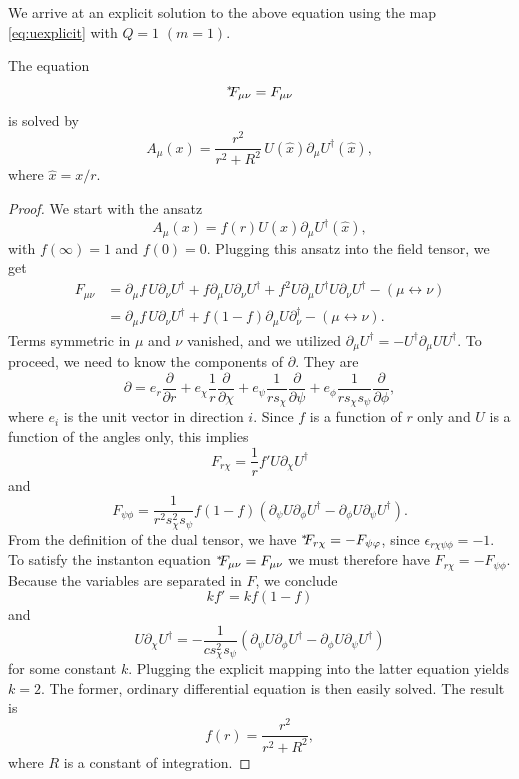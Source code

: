 We arrive at an explicit solution to the above equation using
the map \eqref{eq:uexplicit} with $Q=1$ $(m=1)$.
\begin{proposition}{}{}
The equation
$$
{}^{*\hspace{-1mm}}{F_{\mu\nu}}=F_{\mu\nu}
$$
is solved by
$$
  A_\mu(x)=\frac{r^2}{r^2+R^2}\,U(\hat{x})\partial_\mu U^\dagger(\hat{x}),
$$
where $\hat{x}=x/r.$
  \begin{proof} We start with the ansatz
    $$A_\mu(x)=f(r)U(\hat{x})\partial_\mu U^\dagger(\hat{x}),$$
    with $f(\infty)=1$ and $f(0)=0$. Plugging this ansatz into the
    field tensor, we get
    \begin{equation*}
    \begin{aligned}
      F_{\mu\nu}
        &=\partial_\mu f\,U\partial_\nu U^\dagger
          +f\partial_\mu U\partial_\nu U^\dagger
          +f^2U\partial_\mu U^\dagger U\partial_\nu U^\dagger
          -(\mu\leftrightarrow\nu)\\
        &=\partial_\mu f\,U\partial_\nu U^\dagger
          +f(1-f)\partial_\mu U\partial_\nu^\dagger
          -(\mu\leftrightarrow\nu).
    \end{aligned}
    \end{equation*}
   Terms symmetric in $\mu$ and $\nu$ vanished, and we utilized
    $\partial_\mu U^\dagger=-U^\dagger\partial_\mu UU^\dagger.$
    To proceed, we need to know the components of $\partial$.
    They are
    \begin{equation*}
     \partial=e_r\frac{\partial}{\partial r}
     +e_\chi\frac{1}{r}\frac{\partial}{\partial \chi}
     +e_\psi\frac{1}{rs_{\chi}}\frac{\partial}{\partial \psi}
     +e_\phi\frac{1}{rs_{\chi}s_{\psi}}\frac{\partial}{\partial \phi},
    \end{equation*}
    where $e_i$ is the unit vector in direction $i$. Since $f$ is
    a function of $r$ only and $U$ is a function of the angles
    only, this implies
    $$
      F_{r\chi}=\frac{1}{r}f'U\partial_\chi U^\dagger
    $$
    and
   $$
      F_{\psi\phi}=\frac{1}{r^2s^2_\chi s_\psi}
        f(1-f)\left(\partial_\psi U\partial_\phi U^\dagger
                    -\partial_\phi U\partial_\psi U^\dagger\right).
    $$
    From the definition of the dual tensor, we have
    ${}^{*\hspace{-1mm}}{F_{r\chi}}=-F_{\psi\varphi}$, since $\epsilon_{r\chi\psi\phi}=-1$.
    To satisfy the instanton equation ${}^{*\hspace{-1mm}}{F_{\mu\nu}}=F_{\mu\nu}$
    we must therefore have $F_{r\chi}=-F_{\psi\phi}$. Because
    the variables are separated in $F$, we conclude
    $$
      kf'=kf(1-f)
    $$
   and
    $$
      U\partial_\chi U^\dagger=-\frac{1}{cs_\chi^2s_\psi}
               \left(\partial_\psi U\partial_\phi U^\dagger
                    -\partial_\phi U\partial_\psi U^\dagger\right) 
    $$
    for some constant $k$. Plugging the explicit mapping into the
    latter equation yields $k=2$. The former, ordinary differential
    equation is then easily solved. The result is
    $$
      f(r)=\frac{r^2}{r^2+R^2},
    $$
    where $R$ is a constant of integration.
\end{proof}
\end{proposition}


